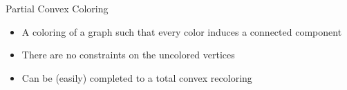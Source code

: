 \begin{frame}{Partial Convex Coloring}
\begin{itemize}


\item
A coloring of a graph such that every color induces a connected component 

\pause\item
There are no constraints on the uncolored vertices

\pause\item
Can be (easily) completed to a total convex recoloring
   
   
\end{itemize}
\pause
\end{frame}
